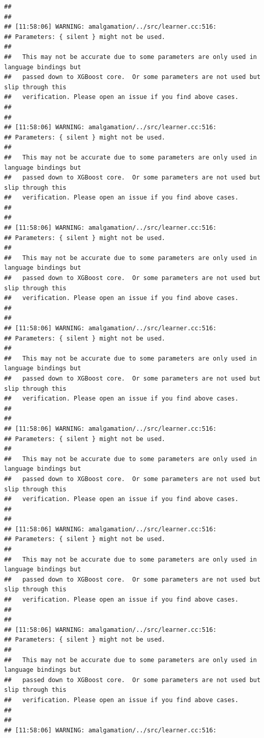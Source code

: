 \documentclass[AMS,STIX2COL]{WileyNJD-v2}\usepackage[]{graphicx}\usepackage[]{color}
\makeatletter
\newenvironment{kframe}{%
 \def\at@end@of@kframe{}%
 \ifinner\ifhmode%
  \def\at@end@of@kframe{\end{minipage}}%
  \begin{minipage}{\columnwidth}%
 \fi\fi%
 \def\FrameCommand##1{\hskip\@totalleftmargin \hskip-\fboxsep
 \colorbox{shadecolor}{##1}\hskip-\fboxsep
     \hskip-\linewidth \hskip-\@totalleftmargin \hskip\columnwidth}%
 \MakeFramed {\advance\hsize-\width
   \@totalleftmargin\z@ \linewidth\hsize
   \@setminipage}}%
 {\par\unskip\endMakeFramed%
 \at@end@of@kframe}
\newenvironment{knitrout}{}{} %
\makeatother
\begin{document}
\begin{knitrout}
\begin{kframe}
\begin{verbatim}
## 
## 
## [11:58:06] WARNING: amalgamation/../src/learner.cc:516: 
## Parameters: { silent } might not be used.
## 
##   This may not be accurate due to some parameters are only used in language bindings but
##   passed down to XGBoost core.  Or some parameters are not used but slip through this
##   verification. Please open an issue if you find above cases.
## 
## 
## [11:58:06] WARNING: amalgamation/../src/learner.cc:516: 
## Parameters: { silent } might not be used.
## 
##   This may not be accurate due to some parameters are only used in language bindings but
##   passed down to XGBoost core.  Or some parameters are not used but slip through this
##   verification. Please open an issue if you find above cases.
## 
## 
## [11:58:06] WARNING: amalgamation/../src/learner.cc:516: 
## Parameters: { silent } might not be used.
## 
##   This may not be accurate due to some parameters are only used in language bindings but
##   passed down to XGBoost core.  Or some parameters are not used but slip through this
##   verification. Please open an issue if you find above cases.
## 
## 
## [11:58:06] WARNING: amalgamation/../src/learner.cc:516: 
## Parameters: { silent } might not be used.
## 
##   This may not be accurate due to some parameters are only used in language bindings but
##   passed down to XGBoost core.  Or some parameters are not used but slip through this
##   verification. Please open an issue if you find above cases.
## 
## 
## [11:58:06] WARNING: amalgamation/../src/learner.cc:516: 
## Parameters: { silent } might not be used.
## 
##   This may not be accurate due to some parameters are only used in language bindings but
##   passed down to XGBoost core.  Or some parameters are not used but slip through this
##   verification. Please open an issue if you find above cases.
## 
## 
## [11:58:06] WARNING: amalgamation/../src/learner.cc:516: 
## Parameters: { silent } might not be used.
## 
##   This may not be accurate due to some parameters are only used in language bindings but
##   passed down to XGBoost core.  Or some parameters are not used but slip through this
##   verification. Please open an issue if you find above cases.
## 
## 
## [11:58:06] WARNING: amalgamation/../src/learner.cc:516: 
## Parameters: { silent } might not be used.
## 
##   This may not be accurate due to some parameters are only used in language bindings but
##   passed down to XGBoost core.  Or some parameters are not used but slip through this
##   verification. Please open an issue if you find above cases.
## 
## 
## [11:58:06] WARNING: amalgamation/../src/learner.cc:516: 

\end{verbatim}
\end{kframe}
\end{knitrout}
\end{document}
